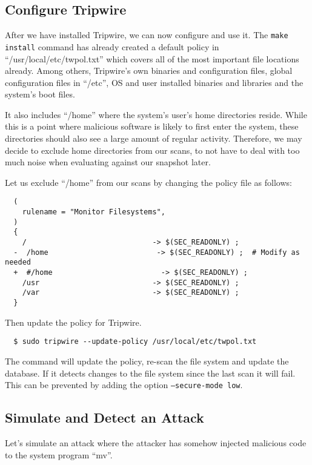 \subsection{Configure Tripwire}

After we have installed Tripwire, we can now configure and use it.
The \texttt{make install} command has already created a default policy in \enquote{/usr/local/etc/twpol.txt} which covers all of the most important file locations already.
Among others, Tripwire's own binaries and configuration files, global configuration files in \enquote{/etc}, OS and user installed binaries and libraries and the system's boot files.

It also includes \enquote{/home} where the system's user's home directories reside.
While this is a point where malicious software is likely to first enter the system, these directories should also see a large amount of regular activity.
Therefore, we may decide to exclude home directories from our scans, to not have to deal with too much noise when evaluating against our snapshot later.

Let us exclude \enquote{/home} from our scans by changing the policy file as follows:

\begin{verbatim}
  (
    rulename = "Monitor Filesystems",
  )
  {
    /                             -> $(SEC_READONLY) ;
  -  /home                         -> $(SEC_READONLY) ;  # Modify as needed
  +  #/home                         -> $(SEC_READONLY) ;
    /usr                          -> $(SEC_READONLY) ;
    /var                          -> $(SEC_READONLY) ;
  }
\end{verbatim}

Then update the policy for Tripwire.

\begin{verbatim}
  $ sudo tripwire --update-policy /usr/local/etc/twpol.txt
\end{verbatim}

The command will update the policy, re-scan the file system and update the database.
If it detects changes to the file system since the last scan it will fail.
This can be prevented by adding the option \texttt{--secure-mode low}.

\subsection{Simulate and Detect an Attack}

Let's simulate an attack where the attacker has somehow injected malicious code to the system program \enquote{mv}.

